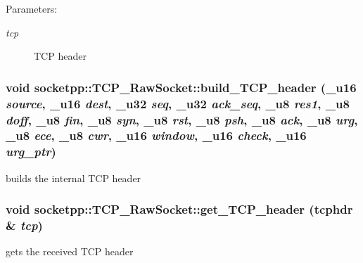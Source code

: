 \begin{Desc}
\item[Parameters:]
\begin{description}
\item[{\em tcp}]TCP header \end{description}
\end{Desc}
\hypertarget{classsocketpp_1_1TCP__RawSocket_443f8b89224427ae95d22b9b305a4990}{
\subsubsection[{build\_\-TCP\_\-header}]{\setlength{\rightskip}{0pt plus 5cm}void socketpp::TCP\_\-RawSocket::build\_\-TCP\_\-header ({\bf \_\-u16} {\em source}, \/  {\bf \_\-u16} {\em dest}, \/  {\bf \_\-u32} {\em seq}, \/  {\bf \_\-u32} {\em ack\_\-seq}, \/  {\bf \_\-u8} {\em res1}, \/  {\bf \_\-u8} {\em doff}, \/  {\bf \_\-u8} {\em fin}, \/  {\bf \_\-u8} {\em syn}, \/  {\bf \_\-u8} {\em rst}, \/  {\bf \_\-u8} {\em psh}, \/  {\bf \_\-u8} {\em ack}, \/  {\bf \_\-u8} {\em urg}, \/  {\bf \_\-u8} {\em ece}, \/  {\bf \_\-u8} {\em cwr}, \/  {\bf \_\-u16} {\em window}, \/  {\bf \_\-u16} {\em check}, \/  {\bf \_\-u16} {\em urg\_\-ptr})}}
\label{classsocketpp_1_1TCP__RawSocket_443f8b89224427ae95d22b9b305a4990}


builds the internal TCP header 

\hypertarget{classsocketpp_1_1TCP__RawSocket_d7e8b2a67c856e11f0e6cfff5f8b8705}{
\subsubsection[{get\_\-TCP\_\-header}]{\setlength{\rightskip}{0pt plus 5cm}void socketpp::TCP\_\-RawSocket::get\_\-TCP\_\-header (tcphdr \& {\em tcp})}}
\label{classsocketpp_1_1TCP__RawSocket_d7e8b2a67c856e11f0e6cfff5f8b8705}


gets the received TCP header 

